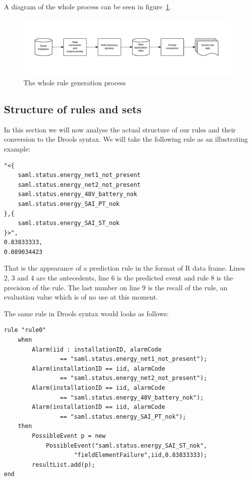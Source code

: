 A diagram of the whole process can be seen in figure~\ref{fig:prototypeGenProcess}.

\begin{figure}[hbtp]
\includegraphics[width=\textwidth]{img/prototypeGenProcess.pdf}
\caption{The whole rule generation process} \label{fig:prototypeGenProcess}
\end{figure}

\subsection{Structure of rules and sets}
\label{sec:structure_of_rules_and_sets}
In this section we will now analyse the actual structure of our rules and their conversion to the Drools syntax. We will take the following rule as an illustrating example:

\begin{verbatim}
"<{
	saml.status.energy_net1_not_present
	saml.status.energy_net2_not_present
	saml.status.energy_48V_battery_nok
	saml.status.energy_SAI_PT_nok
},{
	saml.status.energy_SAI_ST_nok
}>",
0.83833333,
0.089034423
\end{verbatim}

That is the appearance of a prediction rule in the format of R data frame. Lines 2, 3 and 4 are the antecedents, line 6 is the predicted event and rule 8 is the precision of the rule. The last number on line 9 is the recall of the rule, an evaluation value which is of no use at this moment.

The same rule in Drools syntax would looks as follows:

\begin{verbatim}
rule "rule0"
    when 
        Alarm(iid : installationID, alarmCode 
        		== "saml.status.energy_net1_not_present");
        Alarm(installationID == iid, alarmCode 
        		== "saml.status.energy_net2_not_present");
        Alarm(installationID == iid, alarmCode 
        		== "saml.status.energy_48V_battery_nok");
        Alarm(installationID == iid, alarmCode 
        		== "saml.status.energy_SAI_PT_nok");
    then 
        PossibleEvent p = new 
        	PossibleEvent("saml.status.energy_SAI_ST_nok",
        			"fieldElementFailure",iid,0.83833333);
        resultList.add(p);
end
\end{verbatim}

